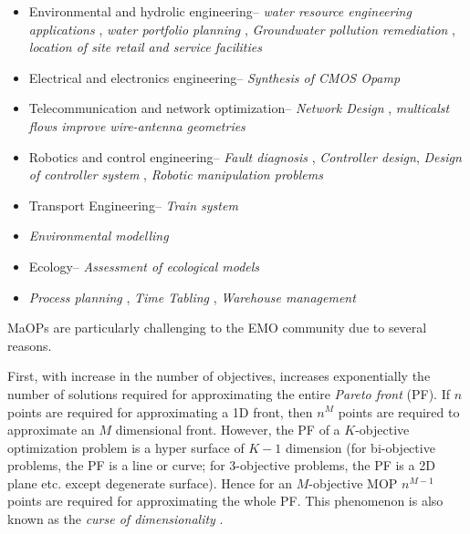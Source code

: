 \documentclass[journal]{IEEEtran}
\begin{document}
\begin{itemize}
\item Environmental and hydrolic engineering-- \textit{water resource engineering applications} \cite{di2006many}, \textit{water portfolio planning} \cite{kasprzyk2009managing}, \textit{Groundwater pollution remediation} \cite{garrett1999parallel}, \textit{location of site retail and service facilities} \cite{Guimaraes94}

\item Electrical and electronics engineering-- \textit{Synthesis of CMOS Opamp} \cite{zebulum1998synthesis}

\item Telecommunication and network optimization-- \textit{Network Design} \cite{tang1997wireless}, \textit{multicalst flows improve wire-antenna geometries} \cite{donoso2005multi}

\item Robotics and control engineering-- \textit{Fault diagnosis} \cite{marcu1999genetic},  \textit{Controller design}\cite{schroder1997multi}\cite{donha1997genetic}, \textit{Design of controller system} \cite{chipperfield1996multiobjective}\cite{whidborne1995algorithms}\cite{tan1997multi}\cite{duarte2000accelerating}\cite{dakev1995h}, \textit{Robotic manipulation problems} \cite{ortmann2001multi}\cite{coello1998using}

\item Transport Engineering-- \textit{Train system} \cite{laumanns2001multi}\cite{qiu1997prioritising}

\item \textit{Environmental modelling} \cite{jarvis1996towards}

\item Ecology-- \textit{Assessment of ecological models} \cite{reynolds1997multi}\cite{reynolds1997multi}

\item \textit{Process planning} \cite{groppetti1997genetic}\cite{rekiek2006assembly}\cite{rekiek2000dealing}\cite{chen2001multi}, \textit{Time Tabling} \cite{paechter1998timetabling}, \textit{Warehouse management } \cite{poulos2001pareto}

\end{itemize}


MaOPs are particularly challenging to the EMO community due to several reasons.

First, with increase in the number of objectives, increases exponentially the number of solutions required for approximating the entire \textit{Pareto front} (PF). If $n$ points are required for approximating a 1D front, then $n^M$ points are required to approximate an $M$ dimensional front. However, the PF of a $K$-objective optimization problem is a hyper surface of $K-1$ dimension (for bi-objective problems, the PF is a line or curve; for 3-objective problems, the PF is a 2D plane etc. except degenerate surface). Hence for an $M$-objective MOP $n^{M-1}$ points are required for approximating the whole PF. This phenomenon is also known as the \textit{curse of dimensionality} \cite{bellman2003dynamic}.
 
\end{document}
